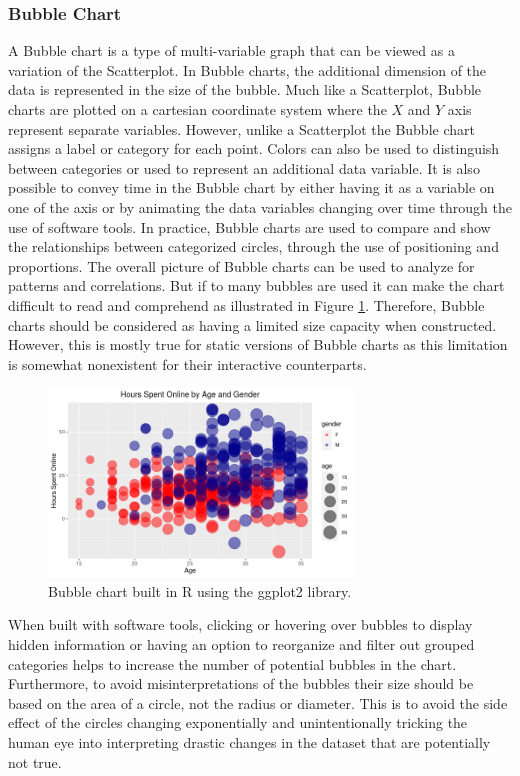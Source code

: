 \subsubsection{Bubble Chart}
A Bubble chart is a type of multi-variable graph that can be viewed as a variation 
of the Scatterplot. In Bubble charts, the additional dimension of the data is represented 
in the size of the bubble. Much like a Scatterplot, Bubble charts are plotted on 
a cartesian coordinate system where the $X$ and $Y$ axis represent separate variables. 
However, unlike a Scatterplot the Bubble chart assigns a label or category for
each point. Colors can also be used to distinguish between categories or used to 
represent an additional data variable. It is also possible to convey time in the
Bubble chart by either having it as a variable on one of the axis or by animating 
the data variables changing over time through the use of software tools. In practice,
Bubble charts are used to compare and show the relationships between categorized 
circles, through the use of positioning and proportions. The overall picture of 
Bubble charts can be used to analyze for patterns and correlations. But if to many bubbles 
are used it can make the chart difficult to read and comprehend as illustrated in 
Figure \ref{figure:bubble_chart}. Therefore, Bubble charts should be considered as
having a limited size capacity when constructed. However, this is mostly true for 
static versions of Bubble charts as this limitation is somewhat nonexistent for 
their interactive counterparts. 

\begin{figure}[!ht]
    \centering
    \includegraphics[height=5cm]{figures/bubble_chart.png}
    \caption{Bubble chart built in R using the ggplot2 library.}
    \label{figure:bubble_chart}
\end{figure} 

When built with software tools, clicking or hovering over bubbles to display hidden 
information or having an option to reorganize and filter out grouped categories 
helps to increase the number of potential bubbles in the chart. Furthermore, to 
avoid misinterpretations of the bubbles their size should be based on the area of 
a circle, not the radius or diameter. This is to avoid the side effect of the circles 
changing exponentially and unintentionally tricking the human eye into interpreting 
drastic changes in the dataset that are potentially not true.

